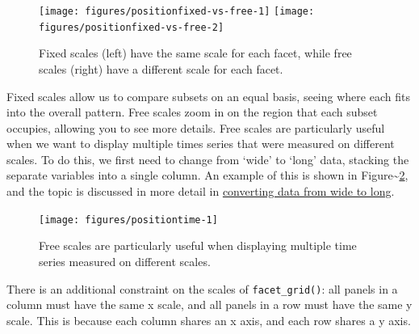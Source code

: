 \begin{figure}
\texttt{[image: figures/positionfixed-vs-free-1]} \texttt{[image: figures/positionfixed-vs-free-2]} \caption{Fixed scales (left) have the same scale for each facet, while free scales (right) have a different scale for each facet. \label{fig:fixed-vs-free}}
\end{figure}

Fixed scales allow us to compare subsets on an equal basis, seeing where
each fits into the overall pattern. Free scales zoom in on the region
that each subset occupies, allowing you to see more details. Free scales
are particularly useful when we want to display multiple times series
that were measured on different scales. To do this, we first need to
change from `wide' to `long' data, stacking the separate variables into
a single column. An example of this is shown in
Figure\textasciitilde{}\ref{fig:time}, and the topic is discussed in
more detail in \hyperref[sec:melting]{converting data from wide to
long}.

\begin{Shaded}
\begin{Highlighting}[]
\StringTok{  }
  \NormalTok{, } \StringTok{ }
\StringTok{  }\StringTok{ } \NormalTok{)}
\end{Highlighting}
\end{Shaded}

\begin{figure}
\texttt{[image: figures/positiontime-1]} \caption{Free scales are particularly useful when displaying multiple time series measured on different scales.\label{fig:time}}
\end{figure}

There is an additional constraint on the scales of
\texttt{facet\_grid()}: all panels in a column must have the same x
scale, and all panels in a row must have the same y scale. This is
because each column shares an x axis, and each row shares a y axis.

